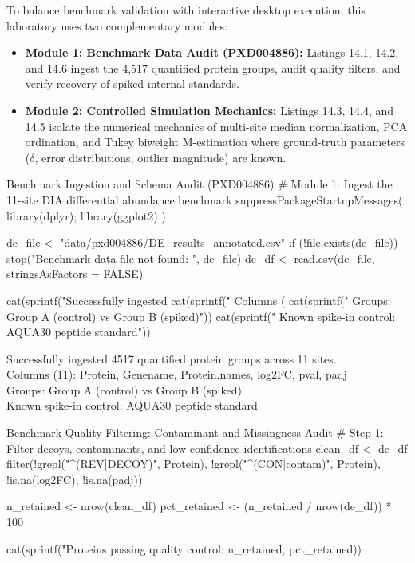 \documentclass[11pt,oneside]{book}
\begin{document}
To balance benchmark validation with interactive desktop execution, this laboratory uses two complementary modules:
\begin{itemize}
    \item \textbf{Module 1: Benchmark Data Audit (PXD004886):} Listings 14.1, 14.2, and 14.6 ingest the 4,517 quantified protein groups, audit quality filters, and verify recovery of spiked internal standards.
    \item \textbf{Module 2: Controlled Simulation Mechanics:} Listings 14.3, 14.4, and 14.5 isolate the numerical mechanics of multi-site median normalization, PCA ordination, and Tukey biweight M-estimation where ground-truth parameters ($\delta$, error distributions, outlier magnitude) are known.
\end{itemize}

\begin{rchunk}{Benchmark Ingestion and Schema Audit (PXD004886)}
# Module 1: Ingest the 11-site DIA differential abundance benchmark
suppressPackageStartupMessages({ library(dplyr); library(ggplot2) })

de_file <- "data/pxd004886/DE_results_annotated.csv"
if (!file.exists(de_file)) stop("Benchmark data file not found: ", de_file)
de_df <- read.csv(de_file, stringsAsFactors = FALSE)

cat(sprintf("Successfully ingested %
cat(sprintf("  Columns (%
cat(sprintf("  Groups: Group A (control) vs Group B (spiked)\n"))
cat(sprintf("  Known spike-in control: AQUA30 peptide standard\n"))
\end{rchunk}

\begin{routput}
Successfully ingested 4517 quantified protein groups across 11 sites.\\
\hspace*{2em}Columns (11): Protein, Genename, Protein.names, log2FC, pval, padj\\
\hspace*{2em}Groups: Group A (control) vs Group B (spiked)\\
\hspace*{2em}Known spike-in control: AQUA30 peptide standard
\end{routput}

\begin{rchunk}{Benchmark Quality Filtering: Contaminant and Missingness Audit}
# Step 1: Filter decoys, contaminants, and low-confidence identifications
clean_df <- de_df %
  filter(!grepl("^(REV|DECOY)", Protein), !grepl("^(CON|contam)", Protein),
         !is.na(log2FC), !is.na(padj))

n_retained   <- nrow(clean_df)
pct_retained <- (n_retained / nrow(de_df)) * 100

cat(sprintf("Proteins passing quality control: %
            n_retained, pct_retained))
\end{rchunk}
\end{document}
